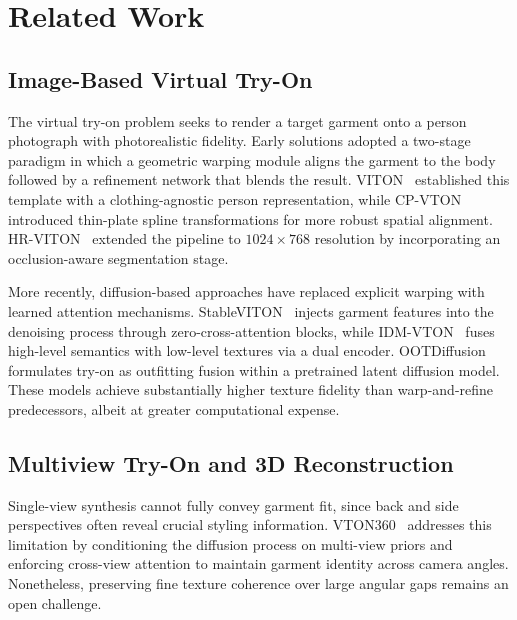 \section{Related Work}

\subsection{Image-Based Virtual Try-On}

The virtual try-on problem seeks to render a target garment onto a person photograph with photorealistic fidelity. Early solutions adopted a two-stage paradigm in which a geometric warping module aligns the garment to the body followed by a refinement network that blends the result. VITON~\cite{han2018viton} established this template with a clothing-agnostic person representation, while CP-VTON~\cite{wang2018cpvton} introduced thin-plate spline transformations for more robust spatial alignment. HR-VITON~\cite{lee2022hrviton} extended the pipeline to $1024 \times 768$ resolution by incorporating an occlusion-aware segmentation stage.

More recently, diffusion-based approaches have replaced explicit warping with learned attention mechanisms. StableVITON~\cite{kim2024stableviton} injects garment features into the denoising process through zero-cross-attention blocks, while IDM-VTON~\cite{choi2024idmvton} fuses high-level semantics with low-level textures via a dual encoder. OOTDiffusion~\cite{xu2024ootdiffusion} formulates try-on as outfitting fusion within a pretrained latent diffusion model. These models achieve substantially higher texture fidelity than warp-and-refine predecessors, albeit at greater computational expense.

\subsection{Multiview Try-On and 3D Reconstruction}

Single-view synthesis cannot fully convey garment fit, since back and side perspectives often reveal crucial styling information. VTON360~\cite{he2025vton360} addresses this limitation by conditioning the diffusion process on multi-view priors and enforcing cross-view attention to maintain garment identity across camera angles. Nonetheless, preserving fine texture coherence over large angular gaps remains an open challenge.

